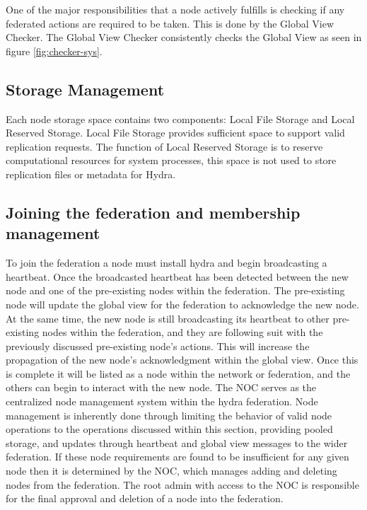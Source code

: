 One of the major responsibilities that a node actively fulfills is checking if any federated actions are required to be taken. This is done by the Global View Checker. The Global View Checker consistently checks the Global View as seen in figure \ref{fig:checker-sys}.

\subsection{Storage Management}
Each node storage space contains two components: Local File Storage and Local Reserved Storage. Local File Storage provides sufficient space to support valid replication requests. The function of Local Reserved Storage is to reserve computational resources for system processes, this space is not used to store replication files or metadata for Hydra.

\subsection{Joining the federation and membership management}

To join the federation a node must install hydra and begin broadcasting a heartbeat. Once the broadcasted heartbeat has been detected between the new node and one of the pre-existing nodes within the federation. The pre-existing node will update the global view for the federation to acknowledge the new node. At the same time, the new node is still broadcasting its heartbeat to other pre-existing nodes within the federation, and they are following suit with the previously discussed pre-existing node's actions. This will increase the propagation of the new node's acknowledgment within the global view. Once this is complete it will be listed as a node within the network or federation, and the others can begin to interact with the new node.
The NOC serves as the centralized node management system within the hydra federation. Node management is inherently done through limiting the behavior of valid node operations to the operations discussed within this section, providing pooled storage, and updates through heartbeat and global view messages to the wider federation. If these node requirements are found to be insufficient for any given node then it is determined by the NOC, which manages adding and deleting nodes from the federation. The root admin with access to the NOC is responsible for the final approval and deletion of a node into the federation.

